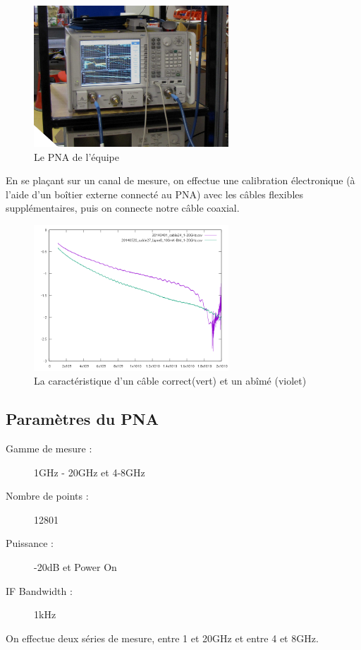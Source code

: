 \begin{figure}[h]
    \begin{center}
        \includegraphics[width=0.65\textwidth]{Images/VNA}
        \caption{Le PNA de l'équipe}
        \label{PNA}
    \end{center}
\end{figure}

En se plaçant sur un canal de mesure, on effectue une calibration électronique (à l'aide d'un boîtier externe connecté au PNA) avec les câbles flexibles supplémentaires, puis on connecte notre câble coaxial.

\begin{figure}[ht]
    \begin{center}
        \includegraphics[width=0.65\textwidth]{Images/Caracs/abime2.png}
        \caption{La caractéristique d'un câble correct(vert) et un abîmé (violet)}
        \label{Carac1}
    \end{center}
\end{figure}

\subsection{Paramètres du PNA}
\begin{description}
    \item[Gamme de mesure :] 1GHz - 20GHz et 4-8GHz
    \item[Nombre de points :] 12801
    \item[Puissance :] -20dB et Power On
    \item[IF Bandwidth :] 1kHz
\end{description}

On effectue deux séries de mesure, entre 1 et 20GHz et entre 4 et 8GHz.
